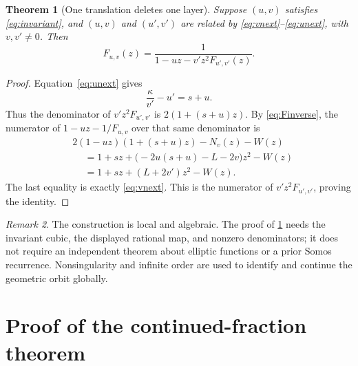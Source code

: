 \documentclass[11pt,letterpaper]{article}
\numberwithin{equation}{section}
\newtheorem{theorem}{Theorem}[section]
\theoremstyle{definition}
\theoremstyle{remark}
\newtheorem{remark}[theorem]{Remark}
\begin{document}
\begin{theorem}[One translation deletes one layer]\label{thm:stripping}
Suppose $(u,v)$ satisfies \eqref{eq:invariant}, and $(u,v)$ and $(u',v')$ are related by
\eqref{eq:vnext}--\eqref{eq:unext}, with $v,v'\ne0$. Then
\begin{equation}\label{eq:stripping}
 \boxed{\qquad
 F_{u,v}(z)=\frac1{1-uz-v'z^2F_{u',v'}(z)}.
 \qquad}
\end{equation}
\end{theorem}
\begin{proof}
Equation~\eqref{eq:unext} gives
\[
 \frac{\kappa}{v'}-u'=s+u.
\]
Thus the denominator of $v'z^2F_{u',v'}$ is
$2(1+(s+u)z)$. By \eqref{eq:Finverse}, the numerator of
$1-uz-1/F_{u,v}$ over that same denominator is
\begin{align*}
 &2(1-uz)(1+(s+u)z)-N_v(z)-W(z)\\
 &\hspace{15pt}=1+sz+
       \bigl(-2u(s+u)-L-2v\bigr)z^2-W(z)\\
 &\hspace{15pt}=1+sz+(L+2v')z^2-W(z).
\end{align*}
The last equality is exactly \eqref{eq:vnext}. This is the numerator of
$v'z^2F_{u',v'}$, proving the identity.
\end{proof}

\begin{remark}
The construction is local and algebraic. The proof of
\cref{thm:stripping} needs the invariant cubic, the displayed rational map,
and nonzero denominators; it does not require an independent theorem about
elliptic functions or a prior Somos recurrence. Nonsingularity and infinite
order are used to identify and continue the geometric orbit globally.
\end{remark}

\section{Proof of the continued-fraction theorem}\label{sec:proof}
\end{document}
